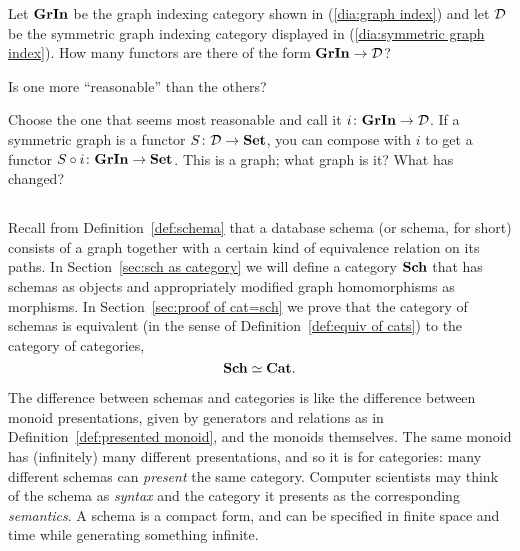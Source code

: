 \documentclass[CT4S-EN-RU]{subfiles}
\begin{document}
\begin{exerciseRUS}
\end{exerciseRUS}

\begin{exerciseENG}
Let ${\mathbf{GrIn}}$ be the graph indexing category shown in (\ref{dia:graph index}) and let $\mathcal{D}$ be the symmetric graph indexing category displayed in (\ref{dia:symmetric graph index}).
\sexc How many functors are there of the form ${\mathbf{GrIn}}\rightarrow\mathcal{D}$?
\item Is one more “reasonable” than the others? 
\item Choose the one that seems most reasonable and call it $i\colon{\mathbf{GrIn}}\rightarrow\mathcal{D}$. If a symmetric graph is a functor $S\colon\mathcal{D}\rightarrow{\mathbf{Set}}$, you can compose with $i$ to get a functor $S\circ i\colon{\mathbf{GrIn}}\rightarrow{\mathbf{Set}}$. This is a graph; what graph is it? What has changed?
\endsexc
\end{exerciseENG}

\begin{exerciseRUS}
\end{exerciseRUS}


\subsection{}\label{sec:schemas and cats intro}

\begin{blockENG}
Recall from Definition~\ref{def:schema} that a database schema (or schema, for short) consists of a graph together with a certain kind of equivalence relation on its paths. In Section~\ref{sec:sch as category} we will define a category ${\mathbf{Sch}}$ that has schemas as objects and appropriately modified graph homomorphisms as morphisms. In Section~\ref{sec:proof of cat=sch} we prove that the category of schemas is equivalent (in the sense of Definition~\ref{def:equiv of cats}) to the category of categories, $${\mathbf{Sch}}\simeq{\mathbf{Cat}}.$$
\end{blockENG}

\begin{blockRUS}
\end{blockRUS}

\begin{blockENG}
The difference between schemas and categories is like the difference between monoid presentations, given by generators and relations as in Definition~\ref{def:presented monoid}, and the monoids themselves. The same monoid has (infinitely) many different presentations, and so it is for categories: many different schemas can {\em present} the same category. Computer scientists may think of the schema as {\em syntax} and the category it presents as the corresponding {\em semantics}. A schema is a compact form, and can be specified in finite space and time while generating something infinite. 
\end{blockENG}
\end{document}
